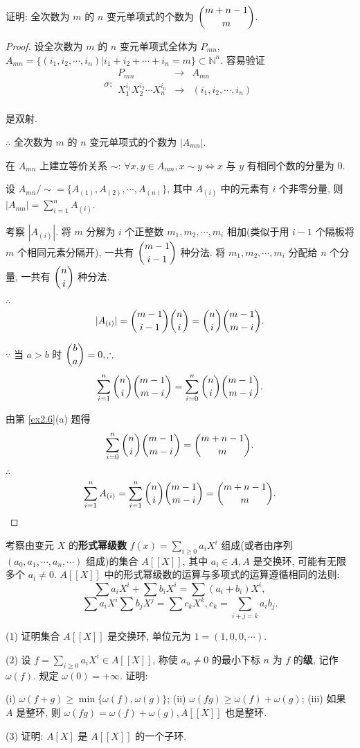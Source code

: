 \documentclass[color=black,device=normal,lang=cn,mode=geye]{elegantnote}
\begin{document}
\begin{exercise}%
    证明: 全次数为 $m$ 的 $n$ 变元单项式的个数为 $\dbinom{m+n-1}{m}$.
\end{exercise}
\begin{proof}
    设全次数为 $m$ 的 $n$ 变元单项式全体为 $P_{mn}$, $A_{mn}=\{(i_1,i_2,\cdots,i_n)|i_1+i_2+\cdots+i_n=m\}\subset\mathbb{N}^n$. 容易验证
    \[\sigma:\begin{array}{rcl}
        P_{mn} & \to & A_{mn} \\
        X_1^{i_1}X_2^{i_2}\cdots X_n^{i_n} & \to & (i_1,i_2,\cdots,i_n) \\
    \end{array}\]

    是双射.

    $\therefore$ 全次数为 $m$ 的 $n$ 变元单项式的个数为 $|A_{mn}|$.

    在 $A_{mn}$ 上建立等价关系 $\sim$: $\forall x,y\in A_{mn},x\sim y\Leftrightarrow x$ 与 $y$ 有相同个数的分量为 $0$.

    设 $ A_{mn}/\sim=\{A_{(1)},A_{(2)},\cdots,A_{(n)}\}$, 其中 $A_{(i)}$ 中的元素有 $i$ 个非零分量, 则 $|A_{mn}|=\sum\limits_{i=1}^nA_{(i)}$.

    考察 $|A_{(i)}|$. 将 $m$ 分解为 $i$ 个正整数 $m_1,m_2,\cdots,m_i$ 相加(类似于用 $i-1$ 个隔板将 $m$ 个相同元素分隔开), 一共有 $\dbinom{m-1}{i-1}$ 种分法. 将 $m_1,m_2,\cdots,m_i$ 分配给 $n$ 个分量, 一共有 $\dbinom{n}{i}$ 种分法.

    $\therefore$
    \[|A_{(i)}|=\dbinom{m-1}{i-1}\dbinom{n}{i}=\dbinom{n}{i}\dbinom{m-1}{m-i}.\]

    $\because$ 当 $a>b$ 时 $\dbinom{b}{a}=0,\therefore$
    \[\sum\limits_{i=1}^n\dbinom{n}{i}\dbinom{m-1}{m-i}=\sum\limits_{i=0}^n\dbinom{n}{i}\dbinom{m-1}{m-i}.\]

    由第 \ref{ex2.6}(a) 题得
    \[\sum\limits_{i=0}^n\dbinom{n}{i}\dbinom{m-1}{m-i}=\dbinom{m+n-1}{m}.\]

    $\therefore$
    \[\sum\limits_{i=1}^nA_{(i)}=\sum\limits_{i=1}^n\dbinom{n}{i}\dbinom{m-1}{m-i}=\dbinom{m+n-1}{m}.\qedhere\]
\end{proof}
\begin{exercise}\label{ex2.5}
    考察由变元 $X$ 的\textbf{形式幂级数} $f(x)=\sum\limits_{i\geq0}a_iX^i$ 组成(或者由序列 $(a_0,a_1,\cdots,a_n,\cdots)$ 组成)的集合 $A[[X]]$, 其中 $a_i\in A,A$ 是交换环, 可能有无限多个 $a_i\neq0$. $A[[X]]$ 中的形式幂级数的运算与多项式的运算遵循相同的法则:
    \[\sum a_iX^i+\sum b_iX^i=\sum(a_i+b_i)X^i,\]
    \[\sum a_iX^i\sum b_jX^j=\sum c_kX^k,c_k=\sum\limits_{i+j=k}a_ib_j.\]

    (1) 证明集合 $A[[X]]$ 是交换环, 单位元为 $1=(1,0,0,\cdots)$.

    (2) 设 $f=\sum\limits_{i\geq0}a_iX^i\in A[[X]]$, 称使 $a_n\neq0$ 的最小下标 $n$ 为 $f$ 的\textbf{级}, 记作 $\omega(f)$. 规定 $\omega(0)=+\infty$. 证明:

    (i) $\omega(f+g)\geq\min\{\omega(f),\omega(g)\}$; (ii) $\omega(fg)\geq\omega(f)+\omega(g)$; (iii) 如果 $A$ 是整环, 则 $\omega(fg)=\omega(f)+\omega(g),A[[X]]$ 也是整环.
    
    (3) 证明: $A[X]$ 是 $A[[X]]$ 的一个子环.
\end{exercise}
\end{document}
